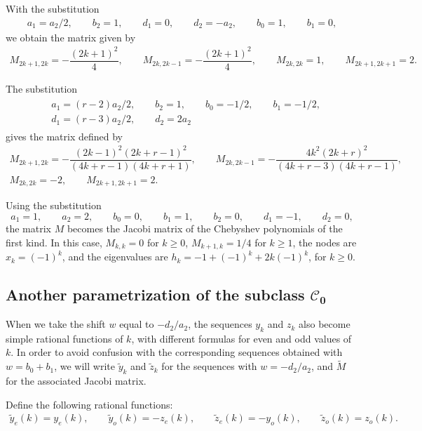 \documentclass[10pt,a4paper]{amsart}
\def\cC{\mathcal C}
\numberwithin{equation}{section}
\begin{document}
With the substitution
\begin{gather*}
 a_1=a_2/2,\qquad b_2=1,\qquad d_1=0,\qquad d_2=-a_2,\qquad b_0=1,\qquad b_1=0,
\end{gather*}
we obtain the matrix given by
\begin{gather*}%
	M_{2k+1,2k}= -\dfrac{(2k+1)^2}{4}, \qquad\!
	M_{2k,2k-1}= -\dfrac{(2k+1)^2}{4},\qquad\!
	M_{2k,2k}= 1,\qquad\!
	M_{2k+1,2k+1}= 2.
\end{gather*}

The substitution
\begin{gather*}
\begin{split}
&a_1=(r-2)a_2/2,\qquad b_2=1,\qquad b_0=-1/2,\qquad b_1=-1/2,\\
 & d_1=(r-3)a_2/2,\qquad d_2= 2 a_2
\end{split}
\end{gather*}
gives the matrix defined by
\begin{gather*}%
	M_{2k+1,2k}= -\dfrac{(2k-1)^2 (2k+r-1)^2}{(4k+r-1)(4k+r+1)}, \qquad
	M_{2k,2k-1}= -\dfrac{4 k^2(2k+r)^2}{(4k+r-3)(4k+r-1)},\\
	M_{2k,2k}= -2,\qquad
	M_{2k+1,2k+1}=2.
\end{gather*}

Using the substitution
\[ a_1=1,\qquad a_2= 2,\qquad b_0=0,\qquad b_1=1,\qquad b_2=0,\qquad d_1=-1,\qquad d_2=0, \]
 the matrix $M$ becomes the Jacobi matrix of the Chebyshev polynomials of the first kind.
In this case, $M_{k,k}=0$ for $k\ge 0$, $M_{k+1,k}=1/4$ for $k \ge 1$, the nodes are $ x_k=(-1)^k$, and the eigenvalues are $h_k=-1+(-1)^k+ 2 k (-1)^k$, for $k\ge 0$.

\subsection[Another parametrization of the subclass C\_0]{Another parametrization of the subclass $\boldsymbol{\cC_0}$}
When we take the shift $w$ equal to $-d_2/a_2$, the sequences $y_k$ and $z_k$ also become simple rational functions of $k$, with different formulas for even and odd values of $k$. In order to avoid confusion with the corresponding sequences obtained with $w=b_0+b_1$, we will write $\tilde y_k$ and $\tilde z_k$ for the sequences with $w=-d_2/a_2$, and $\tilde M$ for the associated Jacobi matrix.

 Define the following rational functions:
 \begin{gather*}%
	 \tilde y_e(k)= y_e(k), \qquad \tilde 	y_o(k)= - z_e(k),\qquad
	 \tilde 	z_e(k)=- y_o(k), \qquad \tilde z_o(k) = z_o(k).
\end{gather*}
\end{document}
